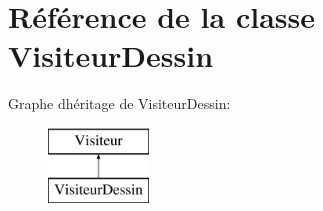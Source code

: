 \hypertarget{class_visiteur_dessin}{}\section{Référence de la classe Visiteur\+Dessin}
\label{class_visiteur_dessin}
Graphe d\textquotesingle{}héritage de Visiteur\+Dessin\+:\begin{figure}[H]
\begin{center}
\leavevmode
\includegraphics[height=2.000000cm]{class_visiteur_dessin}
\end{center}
\end{figure}
